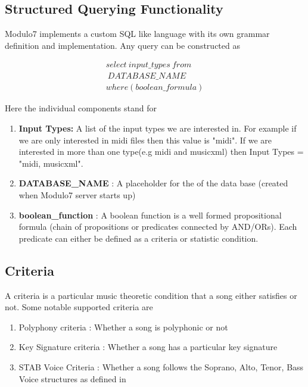 \documentclass{article}
\begin{document}
\subsection{Structured Querying Functionality} \label{structuredquery}

\noindent Modulo7 implements a custom SQL like language with its own grammar definition and implementation. Any query can be constructed as 

\begin{equation}
\begin{aligned}
select \ input\_types \ from \\\ DATABASE\_NAME \\ where (boolean\_formula)
\end{aligned}
\end{equation}

Here the individual components stand for 

\begin{enumerate}
\item \textbf{Input Types: } A list of the input types we are interested in. For example if we are only interested in midi files then this value is "midi". If we are interested in more than one type(e.g midi and musicxml) then Input Types = "midi, musicxml". 
\item \textbf{DATABASE\_NAME} : A placeholder for the of the data base (created when Modulo7 server starts up)
\item \textbf{boolean\_function} : A boolean function is a well formed propositional formula (chain of propositions or predicates connected by AND/ORs). Each predicate can either be defined as a criteria or statistic condition.   
\end{enumerate}

\subsection{Criteria}

A criteria is a particular music theoretic condition that a song either satisfies or not. Some notable supported criteria are 

\begin{enumerate}
\item Polyphony criteria : Whether a song is polyphonic or not
\item Key Signature criteria : Whether a song has a particular key signature
\item STAB Voice Criteria : Whether a song follows the Soprano, Alto, Tenor, Bass Voice structures as defined in \cite{satbcriteria}
\end{enumerate}
\end{document}
